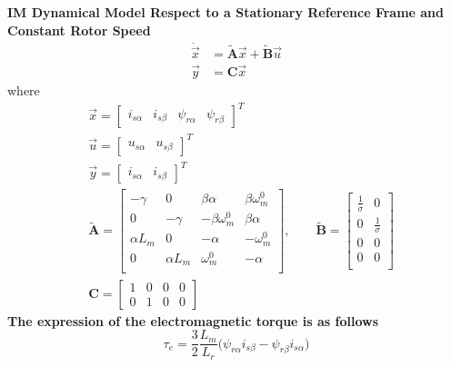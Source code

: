 \documentclass[11pt,a4paper,oneside]{book}
\numberwithin{equation}{section}
\theoremstyle{it}
\theoremstyle{definition}
\begin{document}
\begin{mybox}
	\textbf{IM Dynamical Model Respect to a Stationary Reference Frame and 
		Constant Rotor Speed}
	\begin{equation}\label{im_control_problem_eq_4}
		\begin{aligned}
			\dot{\vec{x}} &=\tilde{\mathbf{A}}\vec{x}+\tilde{\mathbf{B}}\vec{u} 
			\\[6pt]
			{\vec{y}} &={\mathbf{C}}\vec{x}
		\end{aligned}
	\end{equation}
	where
	\begin{equation}\label{im_control_problem_eq_5}
		\begin{aligned}
			&\vec{x} = \begin{bmatrix} 
				i_{s\alpha}&i_{s\beta}&\psi_{r\alpha}&\psi_{r\beta} 
			\end{bmatrix}^T\\[6pt]
			&\vec{u} = \begin{bmatrix} u_{s\alpha}&u_{s\beta} 
			\end{bmatrix}^T\\[6pt]
			&\vec{y} = \begin{bmatrix} i_{s\alpha}&i_{s\beta} 
			\end{bmatrix}^T\\[6pt]
			&\tilde{\mathbf{A}} = \begin{bmatrix}
				-\gamma&0&\beta\alpha&\beta\omega_m^0 \\[6pt]			
				0&-\gamma&-\beta\omega_m^0&\beta\alpha \\[6pt]
				\alpha L_m&0&-\alpha&-\omega_m^0 \\[6pt]
				0&\alpha L_m&\omega_m^0&-\alpha \\[6pt]
			\end{bmatrix},\qquad
			\tilde{\mathbf{B}} = \begin{bmatrix}
				\frac{1}{\sigma}&0 \\[6pt]			
				0&\frac{1}{\sigma} \\[6pt]
				0&0 \\[6pt]
				0&0 \\[6pt]
			\end{bmatrix} \\[6pt]
			&\mathbf{C} = \begin{bmatrix}
				1&0&0&0 \\[6pt]			
				0&1&0&0	
			\end{bmatrix}
		\end{aligned}
	\end{equation}
	\textbf{The expression of the electromagnetic torque is as follows}
	\begin{equation}\label{im_control_problem_eq_6}
		\tau_e = \frac{3}{2}\frac{L_m}{L_r}\Big(\psi_{r\alpha}i_{s\beta} - 
		\psi_{r\beta}i_{s\alpha}\Big)
	\end{equation}
\end{mybox}
\end{document}
